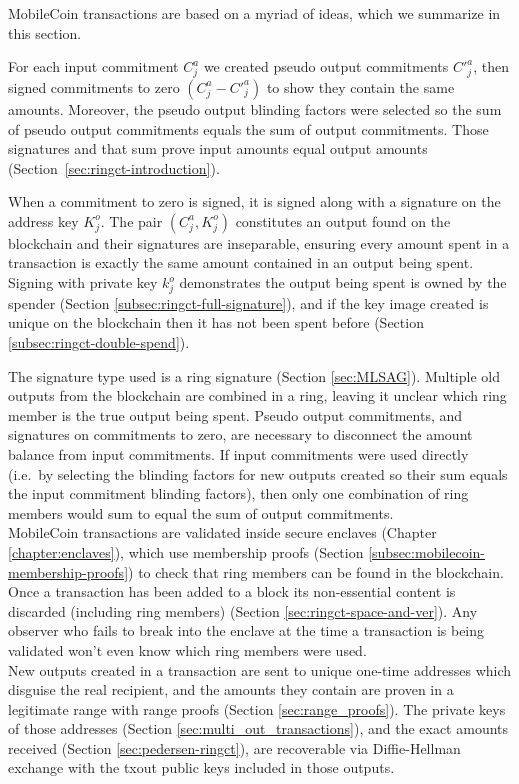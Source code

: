 MobileCoin transactions are based on a myriad of ideas, which we summarize in this section.

For each input commitment $C^a_j$ we created pseudo output commitments $C'^a_j$, then signed commitments to zero $(C^a_j - C'^a_j)$ to show they contain the same amounts. Moreover, the pseudo output blinding factors were selected so the sum of pseudo output commitments equals the sum of output commitments. Those signatures and that sum prove input amounts equal output amounts (Section~\ref{sec:ringct-introduction}).

When a commitment to zero is signed, it is signed along with a signature on the address key $K^o_j$. The pair $(C^a_j, K^o_j)$ constitutes an output found on the blockchain and their signatures are inseparable, ensuring every amount spent in a transaction is exactly the same amount contained in an output being spent. Signing with private key $k^o_j$ demonstrates the output being spent is owned by the spender (Section \ref{subsec:ringct-full-signature}), and if the key image created is unique on the blockchain then it has not been spent before (Section \ref{subsec:ringct-double-spend}).

The signature type used is a ring signature (Section \ref{sec:MLSAG}). Multiple old outputs from the blockchain are combined in a ring, leaving it unclear which ring member is the true output being spent. Pseudo output commitments, and signatures on commitments to zero, are necessary to disconnect the amount balance from input commitments. If input commitments were used directly (i.e.\ by selecting the blinding factors for new outputs created so their sum equals the input commitment blinding factors), then only one combination of ring members would sum to equal the sum of output commitments.\\

MobileCoin transactions are validated inside secure enclaves (Chapter \ref{chapter:enclaves}), which use membership proofs (Section \ref{subsec:mobilecoin-membership-proofs}) to check that ring members can be found in the blockchain. Once a transaction has been added to a block its non-essential content is discarded (including ring members) (Section \ref{sec:ringct-space-and-ver}). Any observer who fails to break into the enclave at the time a transaction is being validated won't even know which ring members were used.\\

New outputs created in a transaction are sent to unique one-time addresses which disguise the real recipient, and the amounts they contain are proven in a legitimate range with range proofs (Section \ref{sec:range_proofs}). The private keys of those addresses (Section \ref{sec:multi_out_transactions}), and the exact amounts received (Section \ref{sec:pedersen-ringct}), are recoverable via Diffie-Hellman exchange with the txout public keys included in those outputs.\\

